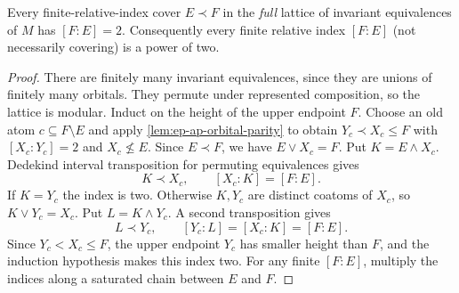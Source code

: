 \begin{theorem}
\label{thm:full-relative-Hasse}
Every finite-relative-index cover $E\prec F$ in the \emph{full}
lattice of invariant equivalences of $M$ has $[F:E]=2$.
Consequently every finite relative index $[F:E]$ (not necessarily
covering) is a power of two.
\end{theorem}
\begin{proof}
There are finitely many invariant equivalences, since they are
unions of finitely many orbitals. They permute under represented
composition, so the lattice is modular. Induct on the height of
the upper endpoint $F$. Choose an old atom
$c\subseteq F\setminus E$ and apply
\cref{lem:ep-ap-orbital-parity} to obtain
$Y_c\prec X_c\le F$ with $[X_c:Y_c]=2$ and $X_c\not\le E$.
Since $E\prec F$, we have $E\vee X_c=F$. Put $K=E\wedge X_c$.
Dedekind interval transposition for permuting equivalences gives
\[
 K\prec X_c,\qquad [X_c:K]=[F:E].
\]
If $K=Y_c$ the index is two. Otherwise $K,Y_c$ are distinct
coatoms of $X_c$, so $K\vee Y_c=X_c$. Put $L=K\wedge Y_c$.
A second transposition gives
\[
 L\prec Y_c,\qquad [Y_c:L]=[X_c:K]=[F:E].
\]
Since $Y_c<X_c\le F$, the upper endpoint $Y_c$ has smaller
height than $F$, and the induction hypothesis makes this index
two. For any finite $[F:E]$, multiply the indices along a
saturated chain between $E$ and $F$.
\end{proof}

